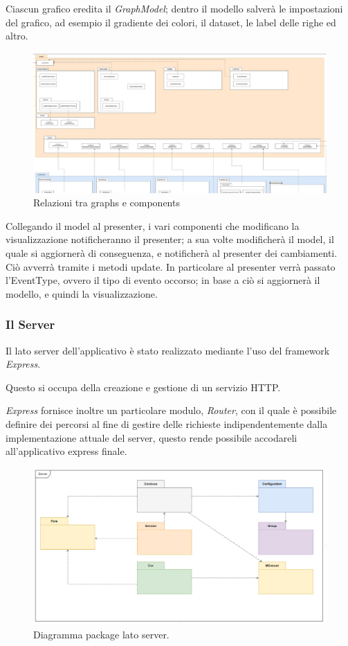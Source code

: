 \documentclass[../manuale_sviluppatore.tex]{subfiles}
\begin{document}
Ciascun grafico eredita il \emph{GraphModel}; dentro il modello salverà le impostazioni del grafico, ad esempio il gradiente dei colori, il dataset, le label delle righe ed altro.

\begin{figure}[H]
	\centering
	\includegraphics[width=18cm]{src/img/graphs-e-components.jpg}
	\caption{Relazioni tra graphs e components}
\end{figure}


Collegando il model al presenter, i vari componenti che modificano la visualizzazione notificheranno il presenter; a sua volte modificherà il model, il quale si aggiornerà di conseguenza, 
e notificherà al presenter dei cambiamenti.
Ciò avverrà tramite i metodi update. In particolare al presenter verrà passato l'EventType, ovvero il tipo di evento occorso; in base a ciò si aggiornerà il modello, e quindi la visualizzazione.

\subsubsection{Il Server}

Il lato server dell'applicativo è stato realizzato mediante l'uso del framework \emph{Express}.

Questo si occupa della creazione e gestione di un servizio HTTP. 

\emph{Express} fornisce inoltre un particolare modulo, \emph{Router}, con il quale è possibile definire dei percorsi 
al fine di gestire delle richieste indipendentemente dalla implementazione attuale del server, questo rende possibile
accodareli all'applicativo express finale.

\begin{figure}[H]
	\centering
	\includegraphics[width=18cm]{img/package-server.png}
	\caption{Diagramma package lato server.}
\end{figure}
\end{document}
